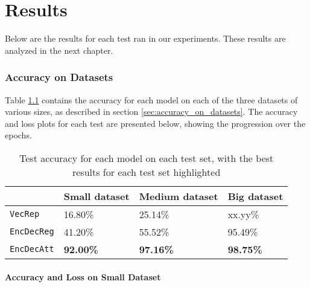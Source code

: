 
\chapter{Results}
\label{ch:results}
Below are the results for each test ran in our experiments. These results are analyzed in the next chapter.

\subsection{Accuracy on Datasets}
Table \ref{table:accuracy_model_data_sets} contains the accuracy for each model on each of the three datasets of various sizes, as described in section \ref{sec:accuracy_on_datasets}. The accuracy and loss plots for each test are presented below, showing the progression over the epochs.

\begin{table}[H]
    \centering
    \begin{tabular}{|l|l|l|l|}
        \hline 
                                        & \textbf{Small dataset}          & \textbf{Medium dataset}         & \textbf{Big dataset}            \\ \hline
        {\tt VecRep }                   & 16.80\%                         & 25.14\%                         & xx.yy\%                         \\ \hline
        {\tt EncDecReg}                 & 41.20\%                         & 55.52\%                         & 95.49\%                         \\ \hline
        {\tt EncDecAtt}                 & \textbf{92.00\%}                & \textbf{97.16\%}                & \textbf{98.75\%}                \\ \hline
    \end{tabular}
    \caption{Test accuracy for each model on each test set, with the best results for each test set highlighted}
    \label{table:accuracy_model_data_sets}
\end{table}

\newpage
\subsubsection{Accuracy and Loss on Small Dataset}

